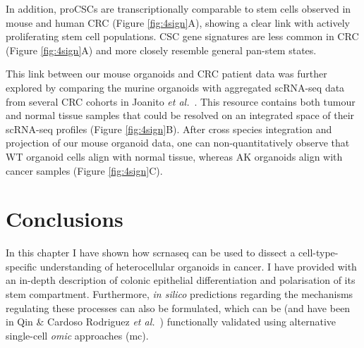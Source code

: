 In addition, proCSCs are transcriptionally comparable to stem cells observed in mouse and human CRC (Figure \ref{fig:4sign}A), showing a clear link with actively proliferating stem cell populations. CSC gene signatures are less common in CRC (Figure \ref{fig:4sign}A) and more closely resemble general pan-stem states.

This link between our mouse organoids and CRC patient data was further explored by comparing the murine organoids with aggregated scRNA-seq data from several CRC cohorts in Joanito \emph{et al.}~\cite{joanito_single-cell_2022}. This resource contains both tumour and normal tissue samples that could be resolved on an integrated space of their scRNA-seq profiles (Figure \ref{fig:4sign}B). After cross species integration and projection of our mouse organoid data, one can non-quantitatively observe that WT organoid cells align with normal tissue, whereas AK organoids align with cancer samples (Figure \ref{fig:4sign}C). 

\newpage
\section{Conclusions}


In this chapter I have shown how \acrshort{scrnaseq} can be used to dissect a cell-type-specific understanding of heterocellular organoids in cancer. I have provided with an in-depth description of colonic epithelial differentiation and polarisation of its stem compartment. Furthermore, \emph{in silico} predictions regarding the mechanisms regulating these processes can also be formulated, which can be (and have been in Qin \& Cardoso Rodriguez \emph{et al.}~\cite{cardoso_rodriguez_single-cell_2023}) functionally validated using alternative single-cell \emph{omic} approaches (\acrshort{mc}).

